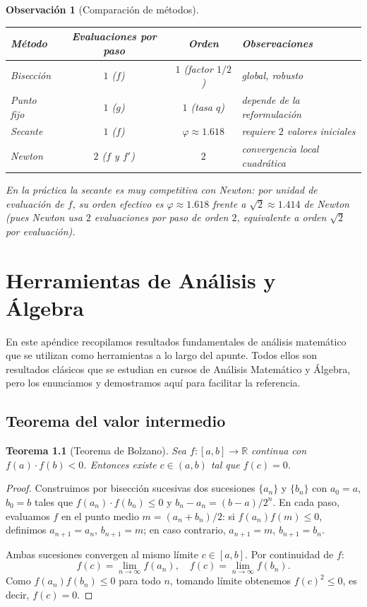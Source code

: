 \documentclass[a4paper,11pt]{report}
\newtheorem{theorem}{Teorema}[chapter]
\newtheorem{remark}[theorem]{Observación}
\begin{document}
\begin{remark}[Comparación de métodos]
\begin{center}
\begin{tabular}{lccl}
\toprule
Método & Evaluaciones por paso & Orden & Observaciones\\
\midrule
Bisección & $1$ ($f$) & $1$ (factor $1/2$) & global, robusto\\
Punto fijo & $1$ ($g$) & $1$ (tasa $q$) & depende de la reformulación\\
Secante    & $1$ ($f$) & $\varphi\approx1.618$ & requiere $2$ valores iniciales\\
Newton     & $2$ ($f$ y $f'$) & $2$ & convergencia local cuadrática\\
\bottomrule
\end{tabular}
\end{center}

En la práctica la secante es muy competitiva con Newton: por unidad de evaluación
de $f$, su orden efectivo es $\varphi\approx 1.618$ frente a $\sqrt{2}\approx 1.414$
de Newton (pues Newton usa $2$ evaluaciones por paso de orden $2$, equivalente
a orden $\sqrt{2}$ por evaluación).
\end{remark}


\appendix

\chapter{Herramientas de Análisis y Álgebra}

En este apéndice recopilamos resultados fundamentales de análisis matemático que se utilizan como herramientas a lo largo del apunte. Todos ellos son resultados clásicos que se estudian en cursos de Análisis Matemático y Álgebra, pero los enunciamos y demostramos aquí para facilitar la referencia.

\section{Teorema del valor intermedio}

\begin{theorem}[Teorema de Bolzano]\label{thm:bolzano}
Sea $f: [a,b] \to \mathbb{R}$ continua con $f(a) \cdot f(b) < 0$. Entonces existe $c \in (a,b)$ tal que $f(c) = 0$.
\end{theorem}

\begin{proof}
Construimos por bisección sucesivas dos sucesiones $\{a_n\}$ y $\{b_n\}$ con $a_0 = a$, $b_0 = b$ tales que $f(a_n) \cdot f(b_n) \leq 0$ y $b_n - a_n = (b-a)/2^n$. En cada paso, evaluamos $f$ en el punto medio $m = (a_n + b_n)/2$: si $f(a_n) f(m) \leq 0$, definimos $a_{n+1} = a_n$, $b_{n+1} = m$; en caso contrario, $a_{n+1} = m$, $b_{n+1} = b_n$.

Ambas sucesiones convergen al mismo límite $c \in [a,b]$. Por continuidad de $f$:
\[
f(c) = \lim_{n \to \infty} f(a_n), \quad f(c) = \lim_{n \to \infty} f(b_n).
\]
Como $f(a_n) f(b_n) \leq 0$ para todo $n$, tomando límite obtenemos $f(c)^2 \leq 0$, es decir, $f(c) = 0$.
\end{proof}
\end{document}
